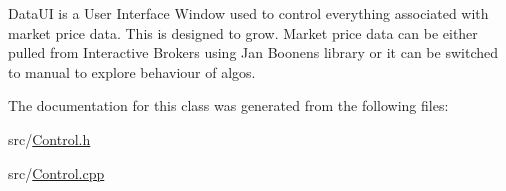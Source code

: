 Data\+UI is a User Interface Window used to control everything associated with market price data. This is designed to grow. Market price data can be either pulled from Interactive Brokers using Jan Boonen\textquotesingle{}s library or it can be switched to \textquotesingle{}manual\textquotesingle{} to explore behaviour of algos. 

The documentation for this class was generated from the following files\+:\begin{DoxyCompactItemize}
\item 
src/\hyperlink{_control_8h}{Control.\+h}\item 
src/\hyperlink{_control_8cpp}{Control.\+cpp}\end{DoxyCompactItemize}
